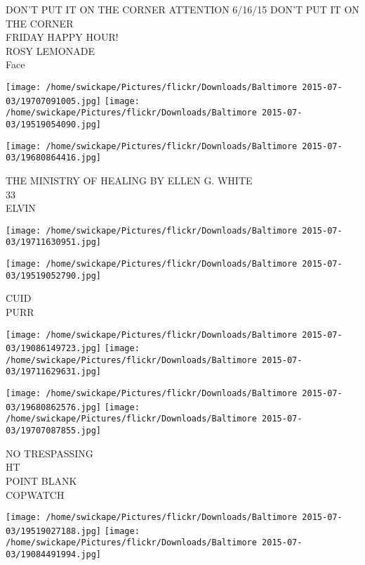 \documentclass[10pt,letterpaper]{article}
\begin{document}
DON'T PUT IT ON THE CORNER ATTENTION 6/16/15 DON'T PUT IT ON THE CORNER\\
FRIDAY HAPPY HOUR!\\
ROSY LEMONADE\\
Face\\
\pagebreak

\texttt{[image: /home/swickape/Pictures/flickr/Downloads/Baltimore 2015-07-03/19707091005.jpg]}
\texttt{[image: /home/swickape/Pictures/flickr/Downloads/Baltimore 2015-07-03/19519054090.jpg]}

\vspace{0.25in}
\texttt{[image: /home/swickape/Pictures/flickr/Downloads/Baltimore 2015-07-03/19680864416.jpg]}

THE MINISTRY OF HEALING BY ELLEN G. WHITE\\
33\\
ELVIN\\
\pagebreak

\texttt{[image: /home/swickape/Pictures/flickr/Downloads/Baltimore 2015-07-03/19711630951.jpg]}

\vspace{0.25in}
\texttt{[image: /home/swickape/Pictures/flickr/Downloads/Baltimore 2015-07-03/19519052790.jpg]}

CUID\\
PURR\\
\pagebreak

\texttt{[image: /home/swickape/Pictures/flickr/Downloads/Baltimore 2015-07-03/19086149723.jpg]}
\texttt{[image: /home/swickape/Pictures/flickr/Downloads/Baltimore 2015-07-03/19711629631.jpg]}

\texttt{[image: /home/swickape/Pictures/flickr/Downloads/Baltimore 2015-07-03/19680862576.jpg]}
\texttt{[image: /home/swickape/Pictures/flickr/Downloads/Baltimore 2015-07-03/19707087855.jpg]}

NO TRESPASSING\\
HT\\
POINT BLANK\\
COPWATCH\\
\pagebreak

\texttt{[image: /home/swickape/Pictures/flickr/Downloads/Baltimore 2015-07-03/19519027188.jpg]}
\texttt{[image: /home/swickape/Pictures/flickr/Downloads/Baltimore 2015-07-03/19084491994.jpg]}
\end{document}
